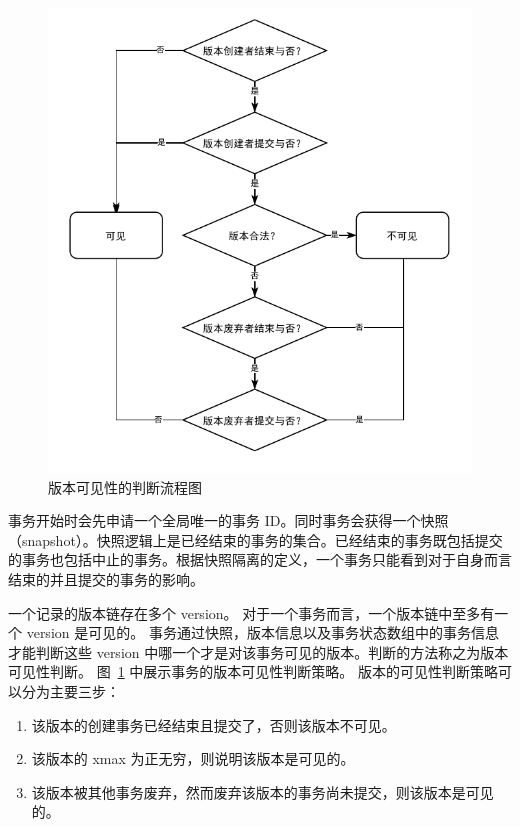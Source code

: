 \begin{figure}[ht]
    \centering
    \includegraphics[width=1\linewidth]{figures/version_visibility.pdf}
    \caption{版本可见性的判断流程图}
    \label{fig:version-visibility}
\end{figure}

事务开始时会先申请一个全局唯一的事务 ID。同时事务会获得一个快照 （snapshot）。快照逻辑上是已经结束的事务的集合。已经结束的事务既包括提交的事务也包括中止的事务。根据快照隔离的定义，一个事务只能看到对于自身而言结束的并且提交的事务的影响。

一个记录的版本链存在多个 version。
对于一个事务而言，一个版本链中至多有一个 version 是可见的。
事务通过快照，版本信息以及事务状态数组中的事务信息才能判断这些 version 中哪一个才是对该事务可见的版本。判断的方法称之为版本可见性判断。
图~\ref{fig:version-visibility} 中展示事务的版本可见性判断策略。
版本的可见性判断策略可以分为主要三步：
\begin{enumerate}
    \item 该版本的创建事务已经结束且提交了，否则该版本不可见。
    \item 该版本的 xmax 为正无穷，则说明该版本是可见的。
    \item 该版本被其他事务废弃，然而废弃该版本的事务尚未提交，则该版本是可见的。
\end{enumerate}


